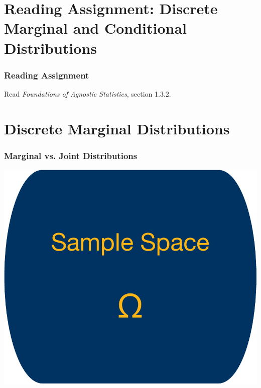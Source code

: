\documentclass[12pt, block=fill]{beamer}
\begin{document}
\section{Reading Assignment: Discrete Marginal and Conditional
  Distributions}

\begin{frame}
  \frametitle{Reading Assignment}
  Read \textit{Foundations of Agnostic Statistics}, section 1.3.2.
\end{frame}

\section{Discrete Marginal Distributions}


\begin{frame}
  \frametitle{Marginal vs. Joint Distributions}
  \includegraphics[width= .4\textwidth ]{figures/sample_space}


\end{frame}
\end{document}
